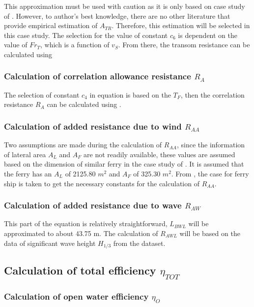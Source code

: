 This approximation must be used with caution as it is only based on case study of . However, to author's best knowledge, there are no other literature that provide empirical estimation of $A_{TR}$. Therefore, this estimation will be selected in this case study. The selection for the value of constant $c_6$ is dependent on the value of $Fr_T$, which is a function of $v_S$. From there, the transom resistance can be calculated using 

\subsubsection*{Calculation of correlation allowance resistance $R_A$}

The selection of constant $c_4$ in equation  is based on the $T_F$, then the correlation resistance $R_A$ can be calculated using .

\subsubsection*{Calculation of added resistance due to wind $R_{AA}$}

Two assumptions are made during the calculation of $R_{AA}$, since the information of lateral area $A_L$ and $A_F$ are not readily available, these values are assumed based on the dimension of similar ferry in the case study of . It is assumed that the ferry has an $A_L$ of 2125.80 $m^2$ and $A_F$ of 325.30 $m^2$. From , the case for ferry ship is taken to get the necessary constants for the calculation of $R_{AA}$. 

\subsubsection*{Calculation of added resistance due to wave $R_{AW}$ }

This part of the equation is relatively straightforward, $L_{BWL}$ will be approximated to about 43.75 m. The calculation of $R_{AWL}$ will be based on the data of significant wave height $H_{1/3}$ from the dataset.

\subsection{Calculation of total efficiency $\eta_{TOT}$}

\subsubsection*{Calculation of open water efficiency $\eta_O$}

